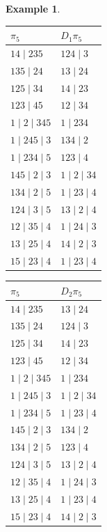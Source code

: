 \documentclass{article}
\newtheorem{example}{Example}
\begin{document}
\begin{example}
{\begin{minipage}[t]{0.48\textwidth}
\centering
\begin{tabular}{l | l}
$\pi_5$ & $D_1\pi_5$ \\
\hline
$14 \mid 235$ & $124 \mid 3$ \\
$135 \mid 24$ & $13 \mid 24$ \\
$125 \mid 34$ & $14 \mid 23$ \\
$123 \mid 45$ & $12 \mid 34$ \\
$1 \mid 2 \mid 345$ & $1 \mid 234$ \\
$1 \mid 245 \mid 3$ & $134 \mid 2$ \\
$1 \mid 234 \mid 5$ & $123 \mid 4$ \\
$145 \mid 2 \mid 3$ & $1 \mid 2 \mid 34$ \\
$134 \mid 2 \mid 5$ & $1 \mid 23 \mid 4$ \\
$124 \mid 3 \mid 5$ & $13 \mid 2 \mid 4$ \\
$12 \mid 35 \mid 4$ & $1 \mid 24 \mid 3$ \\
$13 \mid 25 \mid 4$ & $14 \mid 2 \mid 3$ \\
$15 \mid 23 \mid 4$ & $1 \mid 23 \mid 4$
\end{tabular}
\end{minipage}
\hfill
\begin{minipage}[t]{0.48\textwidth}
\centering
\begin{tabular}{l | l}
$\pi_5$ & $D_2\pi_5$ \\
\hline
$14 \mid 235$ & $13 \mid 24$ \\
$135 \mid 24$ & $124 \mid 3$ \\
$125 \mid 34$ & $14 \mid 23$ \\
$123 \mid 45$ & $12 \mid 34$ \\
$1 \mid 2 \mid 345$ & $1 \mid 234$ \\
$1 \mid 245 \mid 3$ & $1 \mid 2 \mid 34$ \\
$1 \mid 234 \mid 5$ & $1 \mid 23 \mid 4$ \\
$145 \mid 2 \mid 3$ & $134 \mid 2$ \\
$134 \mid 2 \mid 5$ & $123 \mid 4$ \\
$124 \mid 3 \mid 5$ & $13 \mid 2 \mid 4$ \\
$12 \mid 35 \mid 4$ & $1 \mid 24 \mid 3$ \\
$13 \mid 25 \mid 4$ & $1 \mid 23 \mid 4$ \\
$15 \mid 23 \mid 4$ & $14 \mid 2 \mid 3$
\end{tabular}
\end{minipage}

}
\end{example}
\end{document}
